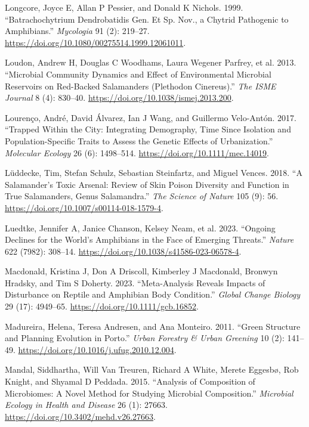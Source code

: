 \documentclass[
  12pt,
]{article}
\newlength{\cslhangindent}
\newenvironment{CSLReferences}[2] %
 {\begin{list}{}{%
  \setlength{\itemindent}{0pt}
  \setlength{\leftmargin}{0pt}
  \setlength{\parsep}{0pt}
  \ifodd #1
   \setlength{\leftmargin}{\cslhangindent}
   \setlength{\itemindent}{-1\cslhangindent}
  \fi
  \setlength{\itemsep}{#2\baselineskip}}}
 {\end{list}}
\begin{document}
\begin{CSLReferences}{1}{1}
Longcore, Joyce E, Allan P Pessier, and Donald K Nichols. 1999.
{``Batrachochytrium Dendrobatidis Gen. Et Sp. Nov., a Chytrid Pathogenic
to Amphibians.''} \emph{Mycologia} 91 (2): 219--27.
\url{https://doi.org/10.1080/00275514.1999.12061011}.

Loudon, Andrew H, Douglas C Woodhams, Laura Wegener Parfrey, et al.
2013. {``Microbial Community Dynamics and Effect of Environmental
Microbial Reservoirs on Red-Backed Salamanders ({Plethodon}
Cinereus).''} \emph{The ISME Journal} 8 (4): 830--40.
\url{https://doi.org/10.1038/ismej.2013.200}.

Lourenço, André, David Álvarez, Ian J Wang, and Guillermo Velo-Antón.
2017. {``Trapped Within the City: {Integrating} Demography, Time Since
Isolation and Population-Specific Traits to Assess the Genetic Effects
of Urbanization.''} \emph{Molecular Ecology} 26 (6): 1498--514.
\url{https://doi.org/10.1111/mec.14019}.

Lüddecke, Tim, Stefan Schulz, Sebastian Steinfartz, and Miguel Vences.
2018. {``A Salamander's Toxic Arsenal: Review of Skin Poison Diversity
and Function in True Salamanders, Genus {Salamandra}.''} \emph{The
Science of Nature} 105 (9): 56.
\url{https://doi.org/10.1007/s00114-018-1579-4}.

{Luedtke, Jennifer A, Janice Chanson, Kelsey Neam, et al.} 2023.
{``Ongoing Declines for the World's Amphibians in the Face of Emerging
Threats.''} \emph{Nature} 622 (7982): 308--14.
\url{https://doi.org/10.1038/s41586-023-06578-4}.

Macdonald, Kristina J, Don A Driscoll, Kimberley J Macdonald, Bronwyn
Hradsky, and Tim S Doherty. 2023. {``Meta-Analysis Reveals Impacts of
Disturbance on Reptile and Amphibian Body Condition.''} \emph{Global
Change Biology} 29 (17): 4949--65.
\url{https://doi.org/10.1111/gcb.16852}.

Madureira, Helena, Teresa Andresen, and Ana Monteiro. 2011. {``Green
Structure and Planning Evolution in {Porto}.''} \emph{Urban Forestry \&
Urban Greening} 10 (2): 141--49.
\url{https://doi.org/10.1016/j.ufug.2010.12.004}.

Mandal, Siddhartha, Will Van Treuren, Richard A White, Merete Eggesbø,
Rob Knight, and Shyamal D Peddada. 2015. {``Analysis of Composition of
Microbiomes: A Novel Method for Studying Microbial Composition.''}
\emph{Microbial Ecology in Health and Disease} 26 (1): 27663.
\url{https://doi.org/10.3402/mehd.v26.27663}.


\end{CSLReferences}
\end{document}
